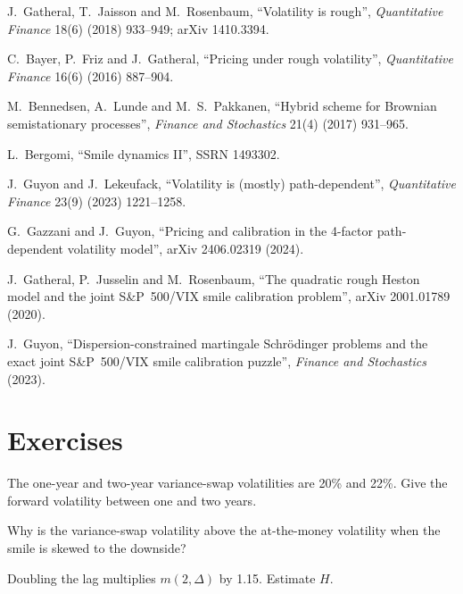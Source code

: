 \begin{omsources}
\item J.~Gatheral, T.~Jaisson and M.~Rosenbaum, ``Volatility is rough'', \emph{Quantitative Finance} 18(6) (2018)
933--949; arXiv 1410.3394.
\item C.~Bayer, P.~Friz and J.~Gatheral, ``Pricing under rough volatility'', \emph{Quantitative Finance} 16(6)
(2016) 887--904.
\item M.~Bennedsen, A.~Lunde and M.~S.~Pakkanen, ``Hybrid scheme for Brownian semistationary processes'',
\emph{Finance and Stochastics} 21(4) (2017) 931--965.
\item L.~Bergomi, ``Smile dynamics II'', SSRN 1493302.
\item J.~Guyon and J.~Lekeufack, ``Volatility is (mostly) path-dependent'', \emph{Quantitative Finance} 23(9)
(2023) 1221--1258.
\item G.~Gazzani and J.~Guyon, ``Pricing and calibration in the 4-factor path-dependent volatility model'',
arXiv 2406.02319 (2024).
\item J.~Gatheral, P.~Jusselin and M.~Rosenbaum, ``The quadratic rough Heston model and the joint S\&P~500/VIX
smile calibration problem'', arXiv 2001.01789 (2020).
\item J.~Guyon, ``Dispersion-constrained martingale Schrödinger problems and the exact joint S\&P~500/VIX smile
calibration puzzle'', \emph{Finance and Stochastics} (2023).
\end{omsources}

\section{Exercises}

\begin{exercise}[$\star$]\label{exo:dv:rough-volatility-and-forward-variance-models:1}
The one-year and two-year variance-swap volatilities are 20\% and 22\%. Give the forward volatility between one
and two years.
\end{exercise}

\begin{exercise}[$\star$]\label{exo:dv:rough-volatility-and-forward-variance-models:2}
Why is the variance-swap volatility above the at-the-money volatility when the smile is skewed to the downside?
\end{exercise}

\begin{exercise}[$\star$]\label{exo:dv:rough-volatility-and-forward-variance-models:3}
Doubling the lag multiplies $m(2,\Delta)$ by 1.15. Estimate $H$.
\end{exercise}


